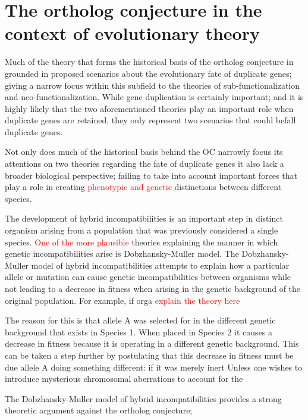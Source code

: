 \section{The ortholog conjecture in the context of evolutionary theory}

Much of the theory that forms the historical basis of the ortholog conjecture in grounded in proposed scenarios about the evolutionary fate of duplicate genes; giving a narrow focus within this subfield to the theories of sub-functionalization and neo-functionalization.  While gene duplication is certainly important; and it is highly likely that the two aforementioned theories play an important role when duplicate genes are retained, they only represent two scenarios that could befall duplicate genes.

Not only does much of the historical basis behind the OC narrowly focus its attentions on two theories regarding the fate of duplicate genes it also lack a broader biological perspective; failing to take into account important forces that play a role in creating \textcolor{red}{phenotypic and genetic} distinctions between different species.

The development of hybrid incompatibilities is an important step in distinct organism arising from a population that was previously considered a single species.  \textcolor{red}{One of the more plausible} theories explaining the manner in which genetic incompatibilities arise is Dobzhansky-Muller model.  The Dobzhansky-Muller model of hybrid incompatibilities attempts to explain how a particular allele or mutation can cause genetic incompatibilities between organisms while not leading to a decrease in fitness when arising in the genetic background of the original population.  For example, if orga \textcolor{red}{explain the theory here}  



The reason for this is that allele A was selected for in the different genetic background that exists in Species 1.  When placed in Species 2 it causes a decrease in fitness because it is operating in a different genetic background.  This can be taken a step further by postulating that this decrease in fitness must be due allele A doing something different: if it was merely inert
Unless one wishes to introduce mysterious chromosomal aberrations to account for the 

The Dobzhansky-Muller model of hybrid incompatibilities provides a strong theoretic argument against the ortholog conjecture; 



